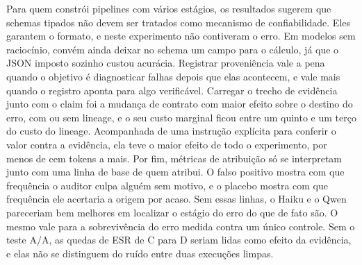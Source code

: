 Para quem constrói pipelines com vários estágios, os resultados sugerem que schemas tipados não devem ser tratados como mecanismo de confiabilidade.
Eles garantem o formato, e neste experimento não contiveram o erro. Em modelos sem raciocínio, convém ainda deixar no schema um campo para o cálculo, já que o JSON imposto sozinho custou acurácia.
Registrar proveniência vale a pena quando o objetivo é diagnosticar falhas depois que elas acontecem, e vale mais quando o registro aponta para algo verificável.
Carregar o trecho de evidência junto com o claim foi a mudança de contrato com maior efeito sobre o destino do erro, com ou sem lineage, e o seu custo marginal ficou entre um quinto e um terço do custo do lineage. Acompanhada de uma instrução explícita para conferir o valor contra a evidência, ela teve o maior efeito de todo o experimento, por menos de cem tokens a mais.
Por fim, métricas de atribuição só se interpretam junto com uma linha de base de quem atribui. O falso positivo mostra com que frequência o auditor culpa alguém sem motivo, e o placebo mostra com que frequência ele acertaria a origem por acaso. Sem essas linhas, o Haiku e o Qwen pareceriam bem melhores em localizar o estágio do erro do que de fato são.
O mesmo vale para a sobrevivência do erro medida contra um único controle. Sem o teste A/A, as quedas de ESR de C para D seriam lidas como efeito da evidência, e elas não se distinguem do ruído entre duas execuções limpas.
